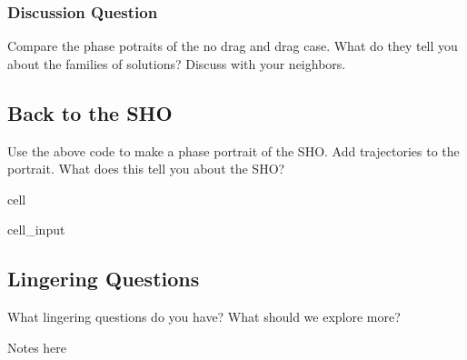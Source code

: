 \documentclass[letterpaper,10pt,english]{jupyterBook}
\begin{document}
\subsubsection{Discussion Question}
\label{\detokenize{content/2_oscillations/activity-SHO_and_dynamical_systems:id4}}
\sphinxAtStartPar
{}

\sphinxAtStartPar
Compare the phase potraits of the no drag and drag case. What do they tell you about the families of solutions? Discuss with your neighbors.


\subsection{Back to the SHO}
\label{\detokenize{content/2_oscillations/activity-SHO_and_dynamical_systems:back-to-the-sho}}
\sphinxAtStartPar
{}

\sphinxAtStartPar
Use the above code to make a phase portrait of the SHO. Add trajectories to the portrait. What does this tell you about the SHO?

\begin{sphinxuseclass}{cell}\begin{sphinxVerbatimInput}

\begin{sphinxuseclass}{cell_input}
\begin{sphinxVerbatim}[commandchars=\\\{\}]
\end{sphinxVerbatim}

\end{sphinxuseclass}\end{sphinxVerbatimInput}

\end{sphinxuseclass}

\subsection{Lingering Questions}
\label{\detokenize{content/2_oscillations/activity-SHO_and_dynamical_systems:lingering-questions}}
\sphinxAtStartPar
{}

\sphinxAtStartPar
What lingering questions do you have? What should we explore more?

\sphinxAtStartPar
Notes here

\sphinxstepscope
\end{document}

